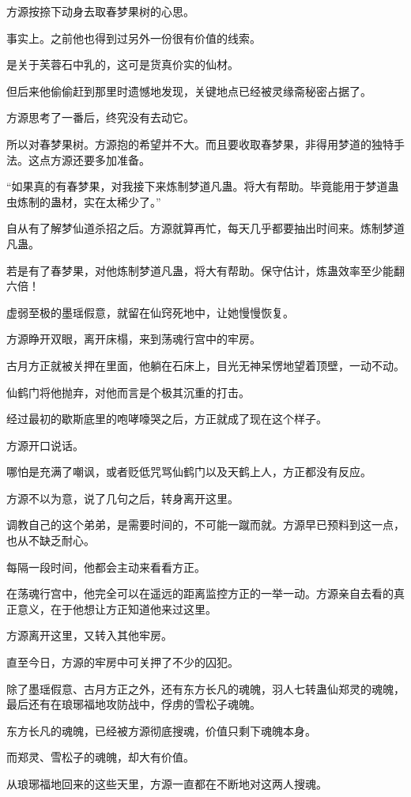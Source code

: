 \begin{this_body}
方源按捺下动身去取春梦果树的心思。

事实上。之前他也得到过另外一份很有价值的线索。

是关于芙蓉石中乳的，这可是货真价实的仙材。

但后来他偷偷赶到那里时遗憾地发现，关键地点已经被灵缘斋秘密占据了。

方源思考了一番后，终究没有去动它。

所以对春梦果树。方源抱的希望并不大。而且要收取春梦果，非得用梦道的独特手法。这点方源还要多加准备。

“如果真的有春梦果，对我接下来炼制梦道凡蛊。将大有帮助。毕竟能用于梦道蛊虫炼制的蛊材，实在太稀少了。”

自从有了解梦仙道杀招之后。方源就算再忙，每天几乎都要抽出时间来。炼制梦道凡蛊。

若是有了春梦果，对他炼制梦道凡蛊，将大有帮助。保守估计，炼蛊效率至少能翻六倍！

虚弱至极的墨瑶假意，就留在仙窍死地中，让她慢慢恢复。

方源睁开双眼，离开床榻，来到荡魂行宫中的牢房。

古月方正就被关押在里面，他躺在石床上，目光无神呆愣地望着顶壁，一动不动。

仙鹤门将他抛弃，对他而言是个极其沉重的打击。

经过最初的歇斯底里的咆哮嚎哭之后，方正就成了现在这个样子。

方源开口说话。

哪怕是充满了嘲讽，或者贬低咒骂仙鹤门以及天鹤上人，方正都没有反应。

方源不以为意，说了几句之后，转身离开这里。

调教自己的这个弟弟，是需要时间的，不可能一蹴而就。方源早已预料到这一点，也从不缺乏耐心。

每隔一段时间，他都会主动来看看方正。

在荡魂行宫中，他完全可以在遥远的距离监控方正的一举一动。方源亲自去看的真正意义，在于他想让方正知道他来过这里。

方源离开这里，又转入其他牢房。

直至今日，方源的牢房中可关押了不少的囚犯。

除了墨瑶假意、古月方正之外，还有东方长凡的魂魄，羽人七转蛊仙郑灵的魂魄，最后还有在琅琊福地攻防战中，俘虏的雪松子魂魄。

东方长凡的魂魄，已经被方源彻底搜魂，价值只剩下魂魄本身。

而郑灵、雪松子的魂魄，却大有价值。

从琅琊福地回来的这些天里，方源一直都在不断地对这两人搜魂。


\end{this_body}
